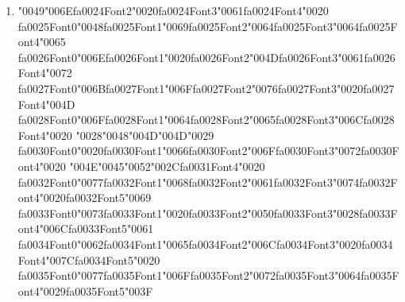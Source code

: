 \documentclass[11pt]{article}
\begin{document}
\begin{enumerate}[label=Q\arabic*., leftmargin=*]
\textbf{A.} It uses only words (observations) and ignores labels

\textbf{B.} It is identical to an HMM

\textbf{C.} It models transitions between labels but does not consider the words

\textbf{D.} It models emissions P(word $\mid$ label)

\item {\char"0049}{\char"006E}{\csname fa0024Font2\endcsname\char"0020}{\csname fa0024Font3\endcsname\char"0061}{\csname fa0024Font4\endcsname\char"0020} {\csname fa0025Font0\endcsname\char"0048}{\csname fa0025Font1\endcsname\char"0069}{\csname fa0025Font2\endcsname\char"0064}{\csname fa0025Font3\endcsname\char"0064}{\csname fa0025Font4\endcsname\char"0065} {\csname fa0026Font0\endcsname\char"006E}{\csname fa0026Font1\endcsname\char"0020}{\csname fa0026Font2\endcsname\char"004D}{\csname fa0026Font3\endcsname\char"0061}{\csname fa0026Font4\endcsname\char"0072} {\csname fa0027Font0\endcsname\char"006B}{\csname fa0027Font1\endcsname\char"006F}{\csname fa0027Font2\endcsname\char"0076}{\csname fa0027Font3\endcsname\char"0020}{\csname fa0027Font4\endcsname\char"004D} {\csname fa0028Font0\endcsname\char"006F}{\csname fa0028Font1\endcsname\char"0064}{\csname fa0028Font2\endcsname\char"0065}{\csname fa0028Font3\endcsname\char"006C}{\csname fa0028Font4\endcsname\char"0020} {\char"0028}{\char"0048}{\char"004D}{\char"004D}{\char"0029} {\csname fa0030Font0\endcsname\char"0020}{\csname fa0030Font1\endcsname\char"0066}{\csname fa0030Font2\endcsname\char"006F}{\csname fa0030Font3\endcsname\char"0072}{\csname fa0030Font4\endcsname\char"0020} {\char"004E}{\char"0045}{\char"0052}{\char"002C}{\csname fa0031Font4\endcsname\char"0020} {\csname fa0032Font0\endcsname\char"0077}{\csname fa0032Font1\endcsname\char"0068}{\csname fa0032Font2\endcsname\char"0061}{\csname fa0032Font3\endcsname\char"0074}{\csname fa0032Font4\endcsname\char"0020}{\csname fa0032Font5\endcsname\char"0069} {\csname fa0033Font0\endcsname\char"0073}{\csname fa0033Font1\endcsname\char"0020}{\csname fa0033Font2\endcsname\char"0050}{\csname fa0033Font3\endcsname\char"0028}{\csname fa0033Font4\endcsname\char"006C}{\csname fa0033Font5\endcsname\char"0061} {\csname fa0034Font0\endcsname\char"0062}{\csname fa0034Font1\endcsname\char"0065}{\csname fa0034Font2\endcsname\char"006C}{\csname fa0034Font3\endcsname\char"0020}{\csname fa0034Font4\endcsname\char"007C}{\csname fa0034Font5\endcsname\char"0020} {\csname fa0035Font0\endcsname\char"0077}{\csname fa0035Font1\endcsname\char"006F}{\csname fa0035Font2\endcsname\char"0072}{\csname fa0035Font3\endcsname\char"0064}{\csname fa0035Font4\endcsname\char"0029}{\csname fa0035Font5\endcsname\char"003F}


\end{enumerate}
\end{document}
